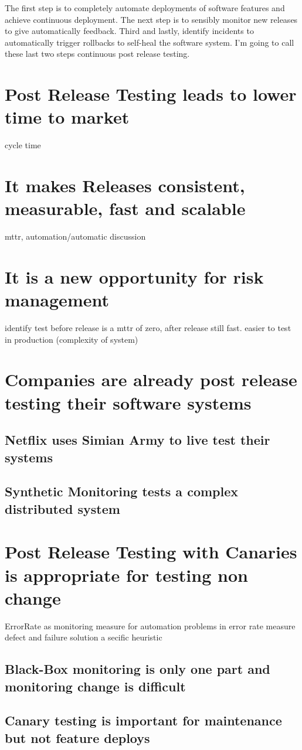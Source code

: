 The first step is to completely automate deployments of software features and achieve continuous deployment. The next step is to sensibly monitor new releases to give automatically feedback. Third and lastly, identify incidents to automatically trigger rollbacks to self-heal the software system. I'm going to call these last two steps continuous post release testing.

\section{Post Release Testing leads to lower time to market}
cycle time
\section{It makes Releases consistent, measurable, fast and scalable}
mttr, automation/automatic discussion
\section{It is a new opportunity for risk management}
identify test before release is a mttr of zero, after release still fast. easier to test in production (complexity of system)
\section{Companies are already post release testing their software systems}
\subsection{Netflix uses Simian Army to live test their systems}
\subsection{Synthetic Monitoring tests a complex distributed system}
\section{Post Release Testing with Canaries is appropriate for testing non change}
ErrorRate as monitoring measure for automation
problems in error rate measure defect and failure
solution a secific heuristic
\subsection{Black-Box monitoring is only one part and monitoring change is difficult}
\subsection{Canary testing is important for maintenance but not feature deploys}
